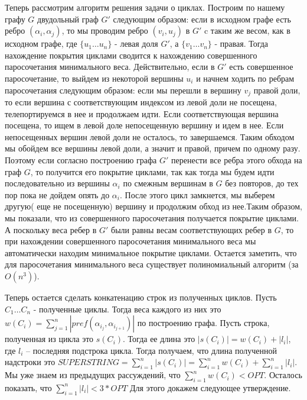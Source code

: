 \documentclass{article}
\begin{document}
Теперь рассмотрим алгоритм решения задачи о циклах. Построим по нашему графу $G$ двудольный граф $G'$ следующим образом:
если в исходном графе есть ребро $(\alpha_i,\alpha_j)$, то мы проводим ребро $(v_i,u_j)$ в $G'$ c таким же весом, как в исходном графе, где $\{ u_1 \ldots u_n \}$ - левая доля $G'$, а $\{ v_1 \ldots v_n \}$ - правая.
Тогда нахождение покрытия циклами сводится к нахождению совершенного паросочетания минимального веса.
Действительно, если в $G'$ есть совершенное паросочетание, то выйдем из некоторой вершины $u_i$  и начнем ходить по ребрам паросочетания следующим образом: если мы перешли в вершину $v_j$ правой доли, то если вершина с соответствующим индексом из левой доли не посещена, телепортируемся в нее и продолжаем идти. Если соответствующая вершина посещена, то ищем в левой доле непосещенную вершину и идем в нее. Если непосещенных вершин левой доли не осталось, то завершаемся. Таким обходом мы обойдем все вершины левой доли, а значит и правой, причем по одному разу. Поэтому если согласно построению графа $G'$ перенести все ребра этого обхода на граф $G$, то получится его покрытие циклами, так как тогда мы будем идти последовательно из вершины $\alpha_i$  по смежным вершинам в $G$ без повторов, до тех пор пока не дойдем опять до  $\alpha_i$. После этого цикл замкнется, мы выберем другую( еще не посещенную) вершину и продолжим обход из нее.Таким образом, мы показали, что из совершенного паросочетания получается покрытие циклами. А поскольку веса ребер в $G'$ были равны весам соответствующих ребер в $G$, то при нахождении совершенного паросочетания минимального веса мы автоматически находим минимальное покрытие циклами.
Остается заметить, что для паросочетания минимального веса существует полиномиальный алгоритм (за $O(n^3)$).

Теперь остается сделать конкатенацию строк из полученных циклов.
Пусть $C_1 \ldots C_n$ - полученные циклы. Тогда веса каждого из них это $w(C_i) = \sum_{j=1}^{n}|pref(\alpha_{i_j},\alpha_{i_{j+1}})|$ по построению графа. Пусть строка, полученная из цикла это $s(C_i)$. Тогда ее длина это $|s(C_i)| = w(C_i) + |l_i|$, где $l_i$ -- последняя подстрока цикла. Тогда получаем, что длина полученной надстроки это $SUPERSTRING = \sum_{i=1}^n|s(C_i)|=\sum_{i=1}^n w(C_i) + \sum_{i=1}^n |l_i|.$
Мы уже знаем из предыдущих рассуждений, что $\sum_{i=1}^n w(C_i) < OPT$. Осталось показать, что $\sum_{i=1}^n |l_i| < 3*OPT$
Для этого докажем следующее утверждение.
\end{document}
